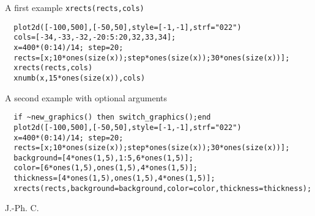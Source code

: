\begin{examples}

A first example \verb!xrects(rects,cols)!

\begin{Verbatim}
  plot2d([-100,500],[-50,50],style=[-1,-1],strf="022")
  cols=[-34,-33,-32,-20:5:20,32,33,34];
  x=400*(0:14)/14; step=20;
  rects=[x;10*ones(size(x));step*ones(size(x));30*ones(size(x))];
  xrects(rects,cols)
  xnumb(x,15*ones(size(x)),cols)
\end{Verbatim}

A second example with optional arguments

\begin{Verbatim}
  if ~new_graphics() then switch_graphics();end
  plot2d([-100,500],[-50,50],style=[-1,-1],strf="022")
  x=400*(0:14)/14; step=20;
  rects=[x;10*ones(size(x));step*ones(size(x));30*ones(size(x))];
  background=[4*ones(1,5),1:5,6*ones(1,5)];
  color=[6*ones(1,5),ones(1,5),4*ones(1,5)];
  thickness=[4*ones(1,5),ones(1,5),4*ones(1,5)];
  xrects(rects,background=background,color=color,thickness=thickness);
\end{Verbatim}

\end{examples}

\begin{manseealso}
   
\end{manseealso}


\begin{authors}
  J.-Ph. C.
\end{authors}
